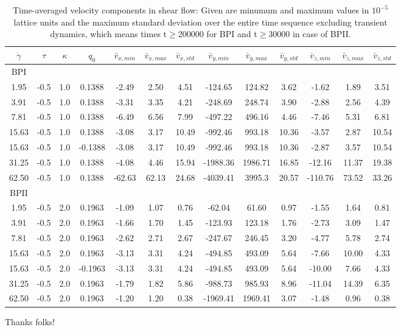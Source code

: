 \documentclass[aps,pre,twocolumn,groupedaddress]{revtex4-1}
\begin{document}
\begin{table}
\begin{tabular}{|c|| c | c| c || c |c |c||c| c| c||c| c| c|}
\hline
$\dot{\gamma}$ & $\tau$ & $\kappa$ & $q_0$ & $\bar{v}_{x,min}$ & $\bar{v}_{x,max}$ & $\bar{v}_{x,std}$ & $\bar{v}_{y,min}$ & $\bar{v}_{y,max}$ & $\bar{v}_{y,std}$ & $\bar{v}_{z,min}$ & $\bar{v}_{z,max}$ & $\bar{v}_{z,std}$ \\
\hline
BPI \\
\hline
1.95 & -0.5 & 1.0 &0.1388 & -2.49 &2.50 &4.51 &-124.65 &124.82 &3.62 &-1.62 &1.89 &3.51 \\
3.91 & -0.5 & 1.0 &0.1388 & -3.31 &3.35 &4.21 &-248.69 &248.74 &3.90 &-2.88 &2.56 &4.39 \\
7.81 & -0.5 & 1.0 &0.1388 &-6.49 &6.56 &7.99 &-497.22 &496.16 &4.46 &-7.46 &5.31 &6.81 \\ 
15.63 & -0.5 & 1.0 &0.1388 &-3.08 &3.17 &10.49 &-992.46 &993.18 &10.36 &-3.57 &2.87 &10.54 \\
15.63 & -0.5 & 1.0 &-0.1388 &-3.08 &3.17 &10.49 &-992.46 &993.18 &10.36 &-2.87 &3.57 &10.54 \\
31.25 & -0.5 & 1.0 &0.1388 &-4.08 &4.46 &15.94 & -1988.36 &1986.71 &16.85 &-12.16 &11.37 &19.38\\
62.50 & -0.5 & 1.0 &0.1388 & -62.63 & 62.13 & 24.68 & -4039.41 &3995.3  & 20.57 &-110.76  &73.52 & 33.26 \\
\hline
BPII \\
\hline
1.95 & -0.5 & 2.0 & 0.1963 & -1.09 &1.07 & 0.76 &  -62.04  &61.60 & 0.97 & -1.55 &1.64 & 0.81\\
3.91 & -0.5 & 2.0 & 0.1963&-1.66 &1.70 & 1.45 &-123.93 &123.18 & 1.76 &-2.73 &3.09 &1.47\\
7.81 &  -0.5 & 2.0 &0.1963& -2.62 &2.71 & 2.67 &-247.67 &246.45 & 3.20 &-4.77 &5.78 &2.74\\
15.63 & -0.5 & 2.0 & 0.1963&-3.13 &3.31 &4.24 &-494.85 &493.09 & 5.64 &-7.66 &10.00 &4.33\\
15.63 & -0.5 & 2.0 &-0.1963& -3.13 &3.31 &4.24 &-494.85 &493.09 & 5.64 &-10.00 &7.66 &4.33\\
31.25 & -0.5 & 2.0 &0.1963 &-1.79 &1.82 &5.86 &-988.73 &985.93 &8.96  &-11.04 &14.39 &6.35\\
62.50 & -0.5 & 2.0 &0.1963 & -1.20 & 1.20 & 0.38 & -1969.41  & 1969.41 & 3.07 &-1.48 &0.96 &0.38 \\
\hline
\end{tabular}
\caption{Time-averaged velocity components in shear flow: Given are minumum and maximum values in $10^{-5}$ lattice units and the maximum standard deviation over the entire time sequence excluding transient dynamics, which means times t$\ge$200000 for BPI and t$\ge$30000 in case of BPII.
\label{table1}}
\end{table}

\begin{acknowledgments}
Thanks folks!
\end{acknowledgments}


\end{document}
